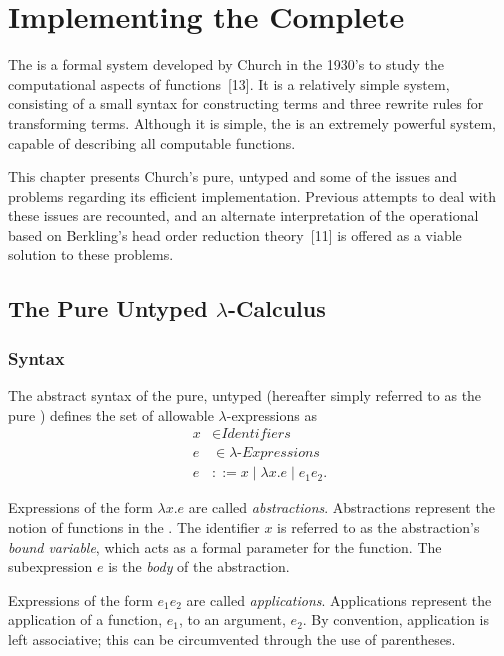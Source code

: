 \chapter{Implementing the Complete \lambdacalculus}

The \lambdacalculus{} is a formal system developed by Church in the 1930's to
study the computational aspects of functions~[13]. It is a relatively simple
system, consisting of a small syntax for constructing terms and three rewrite
rules for transforming terms. Although it is simple, the \lambdacalculus{} is an
extremely powerful system, capable of describing all computable functions.

This chapter presents Church's pure, untyped \lambdacalculus{} and some of the
issues and problems regarding its efficient implementation. Previous attempts to
deal with these issues are recounted, and an alternate interpretation of the
operational \lambdacalculus{} based on Berkling's head order reduction
theory~[11] is offered as a viable solution to these problems.

\section{The Pure Untyped \(\lambda\)-Calculus}

\subsection{Syntax}

The abstract syntax of the pure, untyped \lambdacalculus{} (hereafter simply
referred to as the pure \lambdacalculus) defines the set of allowable
\(\lambda\)-expressions as
\[
\begin{aligned}
x &\in \textit{Identifiers}\\
e &\in \lambda\textit{-Expressions}\\
e &::= x \mid \lambda x.e \mid e_1 e_2 .
\end{aligned}
\]

Expressions of the form \(\lambda x.e\) are called \emph{abstractions}.
Abstractions represent the notion of functions in the \lambdacalculus. The
identifier \(x\) is referred to as the abstraction's \emph{bound variable},
which acts as a formal parameter for the function. The subexpression \(e\) is
the \emph{body} of the abstraction.

Expressions of the form \(e_1 e_2\) are called \emph{applications}.
Applications represent the application of a function, \(e_1\), to an argument,
\(e_2\). By convention, application is left associative; this can be
circumvented through the use of parentheses.

